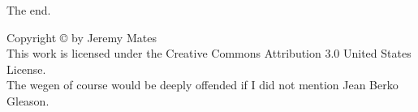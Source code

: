 \documentclass[12pt,letterpaper,onecolumn,twoside,landscape,final]{book}
\begin{document}
\vfill
\begin{flushright}
The end.
\end{flushright}

\backmatter
\newpage
\null
\newpage
\null

\setlength{\parindent}{0pt}
{\fontsize{0.5cm}{1cm}\selectfont
Copyright \copyright{} by Jeremy Mates \\

This work is licensed under the Creative Commons Attribution 3.0 United
States License. \\

The wegen of course would be deeply offended if I did not mention Jean Berko Gleason.
}
\end{document}
